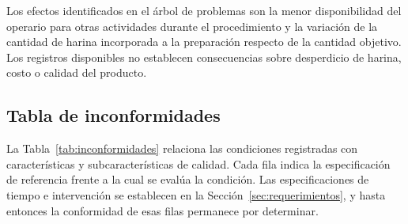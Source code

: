 Los efectos identificados en el árbol de problemas son la menor
disponibilidad del operario para otras actividades durante el procedimiento
y la variación de la cantidad de harina incorporada a la preparación
respecto de la cantidad objetivo. Los registros disponibles no establecen
consecuencias sobre desperdicio de harina, costo o calidad del producto.

\subsection{Tabla de inconformidades}
\label{subsec:inconformidades}


La Tabla~\ref{tab:inconformidades} relaciona las condiciones registradas
con características y subcaracterísticas de calidad. Cada fila indica la
especificación de referencia frente a la cual se evalúa la condición. Las
especificaciones de tiempo e intervención se establecen en la
Sección~\ref{sec:requerimientos}, y hasta entonces la conformidad de esas
filas permanece por determinar.

